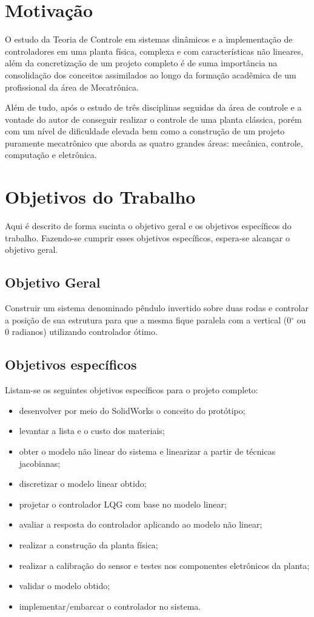 \section{Motivação}
O estudo da Teoria de Controle em sistemas dinâmicos e a implementação de controladores em uma planta física, complexa e com características não lineares, além da concretização de um projeto completo é de suma importância na consolidação dos conceitos assimilados ao longo da formação acadêmica de um profissional da área de Mecatrônica.

Além de tudo, após o estudo de três disciplinas seguidas da área de controle e a vontade do autor de conseguir realizar o controle de uma planta clássica, porém com um nível de dificuldade elevada bem como a construção de um projeto puramente mecatrônico que aborda as quatro grandes áreas: mecânica, controle, computação e eletrônica.

\section{Objetivos do Trabalho}
Aqui é descrito de forma sucinta o objetivo geral e os objetivos específicos do trabalho. Fazendo-se cumprir esses objetivos específicos, espera-se alcançar o objetivo geral.

\subsection{Objetivo Geral}
Construir um sistema denominado pêndulo invertido sobre duas rodas e controlar a posição de sua estrutura para que a mesma fique paralela com a vertical (0$^\circ$ ou 0 radianos) utilizando controlador ótimo.

\subsection{Objetivos específicos}
Listam-se os seguintes objetivos específicos para o projeto completo:
\begin{itemize}
  \item desenvolver por meio do SolidWorks o conceito do protótipo;
  \item levantar a lista e o custo dos materiais;
  \item obter o modelo não linear do sistema e linearizar a partir de técnicas jacobianas;
  \item discretizar o modelo linear obtido;
  \item projetar o controlador LQG com base no modelo linear;
  \item avaliar a resposta do controlador aplicando ao modelo não linear;
  \item realizar a construção da planta física;
  \item realizar a calibração do sensor e testes nos componentes eletrônicos da planta;
  \item validar o modelo obtido;
  \item implementar/embarcar o controlador no sistema.
\end{itemize}


